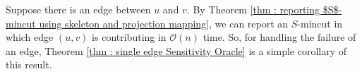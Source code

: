 \documentclass[letterpaper,11pt]{article}
\begin{document}
Suppose there is an edge between $u$ and $v$. By Theorem \ref{thm : reporting $S$-mincut using skeleton and projection mapping}, we can report an $S$-mincut in which edge $(u,v)$ is contributing in ${\mathcal O}(n)$ time. So, for handling the failure of an edge, Theorem \ref{thm : single edge Sensitivity Oracle} is a simple corollary of this result.
\end{document}
